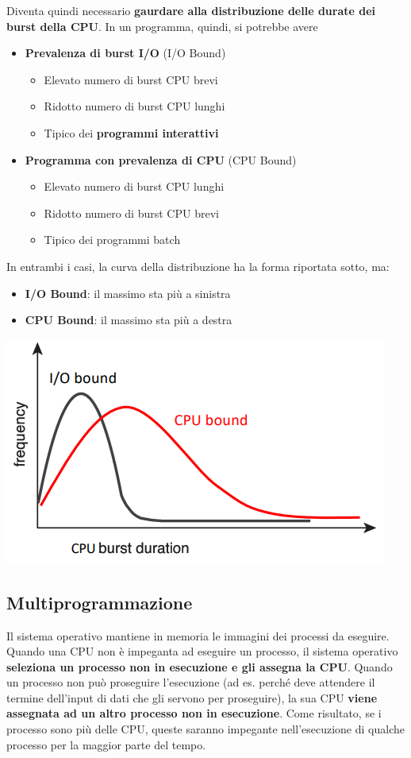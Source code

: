 \documentclass[12pt]{article}
\begin{document}
Diventa quindi necessario \textbf{gaurdare alla distribuzione delle durate dei burst della CPU}.
In un programma, quindi, si potrebbe avere
\begin{itemize}
    \item \textbf{Prevalenza di burst I/O} (I/O Bound)
    \begin{itemize}
        \item Elevato numero di burst CPU brevi
        \item Ridotto numero di burst CPU lunghi
        \item Tipico dei \textbf{programmi interattivi}
    \end{itemize}
    \item \textbf{Programma con prevalenza di CPU} (CPU Bound)
    \begin{itemize}
        \item Elevato numero di burst CPU lunghi
        \item Ridotto numero di burst CPU brevi
        \item Tipico dei programmi batch
    \end{itemize}
\end{itemize}
In entrambi i casi, la curva della distribuzione ha la forma riportata sotto, ma:
\begin{itemize}
    \item \textbf{I/O Bound}: il massimo sta più a sinistra
    \item \textbf{CPU Bound}: il massimo sta più a destra
\end{itemize} 
\begin{center}
    \includegraphics[width = 0.58\linewidth]{Images/37.png}
\end{center}
\subsection{Multiprogrammazione}
Il sistema operativo mantiene in memoria le immagini dei processi da eseguire.
Quando una CPU non è impeganta ad eseguire un processo, il sistema operativo \textbf{seleziona un processo non in esecuzione e gli assegna la CPU}.
Quando un processo non può proseguire l'esecuzione (ad es. perché deve attendere il termine dell'input di dati che gli servono per proseguire), la sua CPU
\textbf{viene assegnata ad un altro processo non in esecuzione}.
Come risultato, se i processo sono più delle CPU, queste saranno impegante nell'esecuzione di qualche processo per la maggior parte del tempo.
\end{document}
